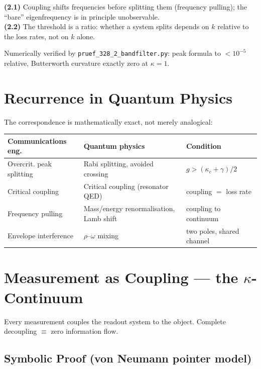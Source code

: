 \begin{tcolorbox}[etabliertbox,title={Two structural statements \E}]
\textbf{(2.1)} Coupling shifts frequencies before splitting them (frequency pulling);
the ``bare'' eigenfrequency is in principle unobservable.\\[2pt]
\textbf{(2.2)} The threshold is a ratio: whether a system splits depends on $k$
relative to the loss rates, not on $k$ alone.
\end{tcolorbox}

\noindent Numerically verified by \texttt{pruef\_328\_2\_bandfilter.py}:
peak formula to $<10^{-5}$ relative, Butterworth curvature exactly zero at $\kappa=1$.

\section{Recurrence in Quantum Physics \E}

The correspondence is mathematically exact, not merely analogical:

\begin{center}
\begin{tabular}{lll}
\toprule
\textbf{Communications eng.} & \textbf{Quantum physics} & \textbf{Condition}\\
\midrule
Overcrit. peak splitting & Rabi splitting, avoided crossing & $g > (\kappa_c+\gamma)/2$\\
Critical coupling & Critical coupling (resonator QED) & coupling $=$ loss rate\\
Frequency pulling & Mass/energy renormalisation, Lamb shift & coupling to continuum\\
Envelope interference & $\rho$–$\omega$ mixing & two poles, shared channel\\
\bottomrule
\end{tabular}
\end{center}

\section{Measurement as Coupling — the $\kappa$-Continuum \B}

Every measurement couples the readout system to the object. Complete decoupling
$\equiv$ zero information flow.

\subsection{Symbolic Proof (von Neumann pointer model)}

